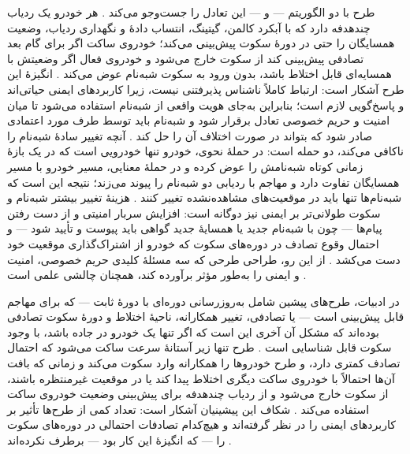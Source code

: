طرح  با دو الگوریتم —  و  — این تعادل را جست‌وجو می‌کند \cite{al-aniPrivacySafetyImprovement2023}. هر خودرو یک ردیاب چندهدفه  دارد که با آبکرد کالمن، گیتینگ، انتساب دادهٔ  و نگهداری ردیاب، وضعیت همسایگان را حتی در دورهٔ سکوت پیش‌بینی می‌کند؛ خودروی ساکت اگر برای گام بعد تصادفی پیش‌بینی کند از سکوت خارج می‌شود و خودروی فعال اگر وضعیتش با همسایه‌ای قابل اختلاط باشد، بدون ورود به سکوت شبه‌نام عوض می‌کند \cite{al-aniPrivacySafetyImprovement2023}. انگیزهٔ این طرح آشکار است: ارتباط کاملاً ناشناس پذیرفتنی نیست، زیرا کاربردهای ایمنی حیاتی‌اند و پاسخ‌گویی لازم است؛ بنابراین به‌جای هویت واقعی از شبه‌نام استفاده می‌شود تا میان امنیت و حریم خصوصی تعادل برقرار شود و شبه‌نام باید توسط طرف مورد اعتمادی صادر شود که بتواند در صورت اختلاف آن را حل کند \cite{al-aniPrivacySafetyImprovement2023}. آنچه تغییر سادهٔ شبه‌نام را ناکافی می‌کند، دو حمله است: در حملهٔ نحوی، خودرو تنها خودرویی است که در یک بازهٔ زمانی کوتاه شبه‌نامش را عوض کرده و در حملهٔ معنایی، مسیر خودرو با مسیر همسایگان تفاوت دارد و مهاجم با ردیابی دو شبه‌نام را پیوند می‌زند؛ نتیجه این است که شبه‌نام‌ها تنها باید در موقعیت‌های مشاهده‌نشده تغییر کنند \cite{al-aniPrivacySafetyImprovement2023}. هزینهٔ تغییر بیشتر شبه‌نام و سکوت طولانی‌تر بر ایمنی نیز دوگانه است: افزایش سربار امنیتی و از دست رفتن پیام‌ها — چون با شبه‌نام جدید یا همسایهٔ جدید گواهی باید پیوست و تأیید شود — و احتمال وقوع تصادف در دوره‌های سکوت که خودرو از اشتراک‌گذاری موقعیت خود دست می‌کشد \cite{al-aniPrivacySafetyImprovement2023}. از این رو، طراحی طرحی که سه مسئلهٔ کلیدی حریم خصوصی، امنیت و ایمنی را به‌طور مؤثر برآورده کند، همچنان چالشی علمی است \cite{al-aniPrivacySafetyImprovement2023}.

در ادبیات، طرح‌های پیشین شامل به‌روزرسانی دوره‌ای با دورهٔ ثابت — که برای مهاجم قابل پیش‌بینی است — یا تصادفی، تغییر همکارانه، ناحیهٔ اختلاط و دورهٔ سکوت تصادفی بوده‌اند که مشکل آن آخری این است که اگر تنها یک خودرو در جاده باشد، با وجود سکوت قابل شناسایی است \cite{al-aniPrivacySafetyImprovement2023}. طرح  تنها زیر آستانهٔ سرعت ساکت می‌شود که احتمال تصادف کمتری دارد، و طرح  خودروها را همکارانه وارد سکوت می‌کند و زمانی که بافت آن‌ها احتمالاً با خودروی ساکت دیگری اختلاط پیدا کند یا در موقعیت غیرمنتظره باشند، از سکوت خارج می‌شود و از ردیاب چندهدفه برای پیش‌بینی وضعیت خودروی ساکت استفاده می‌کند \cite{al-aniPrivacySafetyImprovement2023}. شکاف این پیشینیان آشکار است: تعداد کمی از طرح‌ها تأثیر بر کاربردهای ایمنی را در نظر گرفته‌اند و هیچ‌کدام تصادفات احتمالی در دوره‌های سکوت را — که انگیزهٔ این کار بود — برطرف نکرده‌اند \cite{al-aniPrivacySafetyImprovement2023}.

